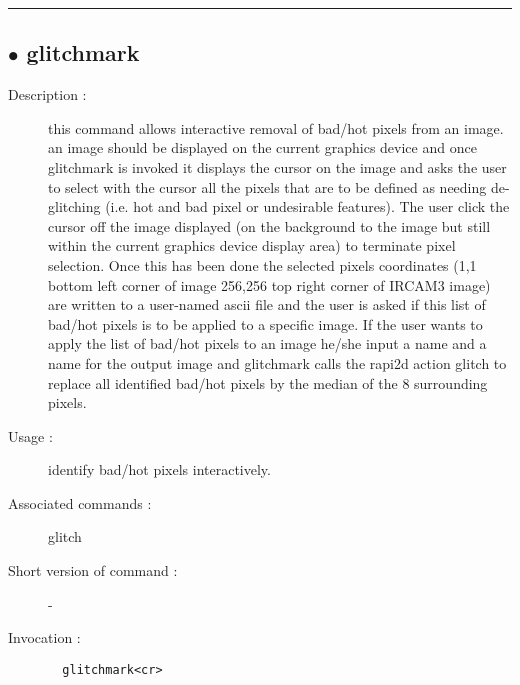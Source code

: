 \hrule \subsection*{$\bullet$ glitchmark}
\begin{description}
\item[Description :] this command allows interactive removal of bad/hot pixels
from an image.  an image should be displayed on the current graphics
device and once glitchmark is invoked it displays the cursor on the image
and asks the user to select with the cursor all the pixels that are to be
defined as needing de-glitching (i.e. hot and bad pixel or undesirable
features).  The user click the cursor off the image displayed (on the
background to the image but still within the current graphics device
display area) to terminate pixel selection.  Once this has been done the
selected pixels coordinates (1,1 bottom left corner of image 256,256 top
right corner of {\sc IRCAM3} image) are written to a user-named ascii file and
the user is asked if this list of bad/hot pixels is to be applied to a
specific image.  If the user wants to apply the list of bad/hot pixels to
an image he/she input a name and a name for the output image and
glitchmark calls the rapi2d action glitch to replace all identified
bad/hot pixels by the median of the 8 surrounding pixels.
\item[Usage :] identify bad/hot pixels interactively.
\item[Associated commands :] glitch
\item[Short version of command :] -
\item[Invocation :]

\verb+  glitchmark<cr> +\end{description}

